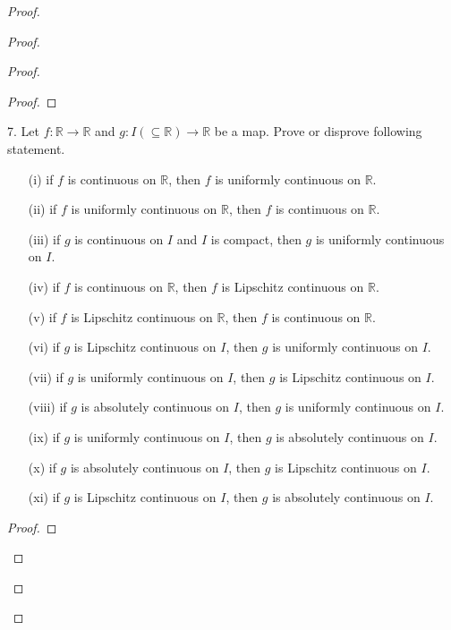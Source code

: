 \documentclass{report}
\begin{document}
\begin{proof}
\begin{proof}
\begin{proof}
\begin{proof}
\end{proof}
\begin{question}{}{}
7. Let \( f : \mathbb{R} \rightarrow \mathbb{R} \) and \( g : I (\subseteq \mathbb{R}) \rightarrow \mathbb{R} \) be a map. Prove or disprove following statement.
\begin{itemize}
    \item[(i)] if \( f \) is continuous on \( \mathbb{R} \), then \( f \) is uniformly continuous on \( \mathbb{R} \).
    \item[(ii)] if \( f \) is uniformly continuous on \( \mathbb{R} \), then \( f \) is continuous on \( \mathbb{R} \).
    \item[(iii)] if \( g \) is continuous on \( I \) and \( I \) is compact, then \( g \) is uniformly continuous on \( I \).
    \item[(iv)] if \( f \) is continuous on \( \mathbb{R} \), then \( f \) is Lipschitz continuous on \( \mathbb{R} \).
    \item[(v)] if \( f \) is Lipschitz continuous on \( \mathbb{R} \), then \( f \) is continuous on \( \mathbb{R} \).
    \item[(vi)] if \( g \) is Lipschitz continuous on \( I \), then \( g \) is uniformly continuous on \( I \).
    \item[(vii)] if \( g \) is uniformly continuous on \( I \), then \( g \) is Lipschitz continuous on \( I \).
    \item[(viii)] if \( g \) is absolutely continuous on \( I \), then \( g \) is uniformly continuous on \( I \).
    \item[(ix)] if \( g \) is uniformly continuous on \( I \), then \( g \) is absolutely continuous on \( I \).
    \item[(x)] if \( g \) is absolutely continuous on \( I \), then \( g \) is Lipschitz continuous on \( I \).
    \item[(xi)] if \( g \) is Lipschitz continuous on \( I \), then \( g \) is absolutely continuous on \( I \).
\end{itemize}
\end{question}
\begin{proof}


\end{proof}
\end{proof}
\end{proof}
\end{proof}
\end{document}

